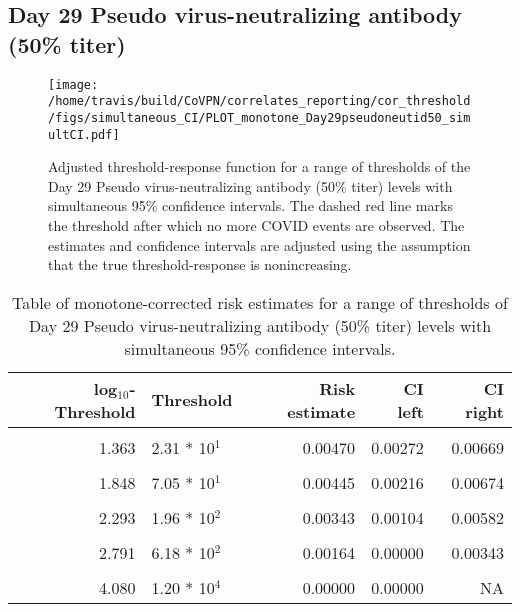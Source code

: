 \documentclass[]{book}
\theoremstyle{definition}
\theoremstyle{definition}
\theoremstyle{definition}
\newcommand{\1}{\mathbbm{1}}
\begin{document}
\clearpage

\clearpage

\clearpage

\hypertarget{day-29-pseudo-virus-neutralizing-antibody-50-titer-3}{%
\subsection{Day 29 Pseudo virus-neutralizing antibody (50\% titer)}\label{day-29-pseudo-virus-neutralizing-antibody-50-titer-3}}

\begin{figure}[H]
\centering
\texttt{[image: /home/travis/build/CoVPN/correlates\_reporting/cor\_threshold/figs/simultaneous\_CI/PLOT\_monotone\_Day29pseudoneutid50\_simultCI.pdf]}
\caption{Adjusted threshold-response function for a range of thresholds of the
  Day 29 Pseudo virus-neutralizing antibody (50\% titer) levels with simultaneous 95\% confidence intervals. The dashed red line marks the threshold after which no more COVID events are observed. The estimates and confidence intervals are adjusted using the assumption that the true threshold-response is nonincreasing.}
\end{figure}
\begin{table}[!h]

\caption{\label{tab:unnamed-chunk-407}Table of monotone-corrected risk estimates for a range of thresholds of Day 29 Pseudo virus-neutralizing antibody (50\% titer) levels with simultaneous 95\% confidence intervals.}
\centering
\begin{tabular}[t]{rlrrr}
\toprule
log$_{10}$-Threshold & Threshold & Risk estimate & CI left & CI right\\
\midrule
\cellcolor{gray!6}{0.699} & \cellcolor{gray!6}{5.00 * 10$^0$} & \cellcolor{gray!6}{0.00585} & \cellcolor{gray!6}{0.00382} & \cellcolor{gray!6}{0.00788}\\
1.363 & 2.31 * 10$^1$ & 0.00470 & 0.00272 & 0.00669\\
\cellcolor{gray!6}{1.628} & \cellcolor{gray!6}{4.25 * 10$^1$} & \cellcolor{gray!6}{0.00468} & \cellcolor{gray!6}{0.00254} & \cellcolor{gray!6}{0.00683}\\
1.848 & 7.05 * 10$^1$ & 0.00445 & 0.00216 & 0.00674\\
\cellcolor{gray!6}{2.078} & \cellcolor{gray!6}{1.20 * 10$^2$} & \cellcolor{gray!6}{0.00411} & \cellcolor{gray!6}{0.00180} & \cellcolor{gray!6}{0.00642}\\
2.293 & 1.96 * 10$^2$ & 0.00343 & 0.00104 & 0.00582\\
\cellcolor{gray!6}{2.537} & \cellcolor{gray!6}{3.44 * 10$^2$} & \cellcolor{gray!6}{0.00164} & \cellcolor{gray!6}{0.00000} & \cellcolor{gray!6}{0.00345}\\
2.791 & 6.18 * 10$^2$ & 0.00164 & 0.00000 & 0.00343\\
\cellcolor{gray!6}{3.109} & \cellcolor{gray!6}{1.29 * 10$^3$} & \cellcolor{gray!6}{0.00164} & \cellcolor{gray!6}{0.00000} & \cellcolor{gray!6}{0.00565}\\
4.080 & 1.20 * 10$^4$ & 0.00000 & 0.00000 & NA\\
\bottomrule
\end{tabular}
\end{table}
\end{document}
